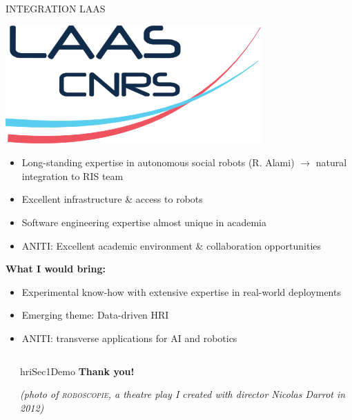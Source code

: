 \documentclass[xcolor=table]{beamer}
\begin{document}
\begin{frame}{INTEGRATION LAAS}

    \begin{center}
        \includegraphics[width=0.3\linewidth]{Laas-CNRS}

    \end{center}

    \begin{itemize}
        \item Long-standing expertise in autonomous social robots (R. Alami) $\rightarrow$ natural integration to RIS team
        \item Excellent infrastructure \& access to robots
        \item Software engineering expertise almost unique in academia
        \item ANITI: Excellent academic environment \& collaboration
            opportunities
    \end{itemize}

    \pause

    \textbf{What I would bring:}

    \begin{itemize}
        \item Experimental know-how with extensive expertise in real-world deployments
        \item Emerging theme: Data-driven HRI
        \item ANITI: transverse applications for AI and robotics
    \end{itemize}
\end{frame}


{
    \begin{frame}[plain]

        \begin{columns}
            \begin{column}{0.6\linewidth}
            \end{column}
            \begin{column}{0.4\linewidth}

                \vspace{6em}
                \begin{beamercolorbox}[wd=\linewidth,ht=6ex,dp=0.7ex]{hriSec1Demo}
                    \textbf{Thank you!}
                \end{beamercolorbox}
                \vspace{12em}
                {\scriptsize
                \textcolor{white!60!black}{\emph{(photo of 
                \textsc{roboscopie}, a theatre play I created with director Nicolas Darrot in
                2012)}}
                }
            \end{column}
        \end{columns}
    \end{frame}
}
\end{document}
